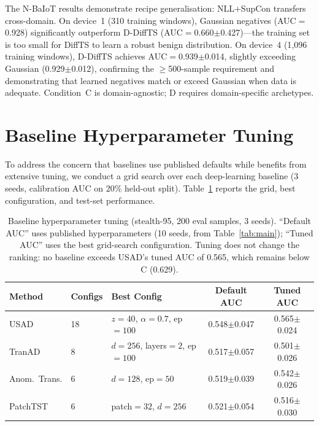 The N-BaIoT results demonstrate recipe generalisation:
NLL$+$SupCon transfers cross-domain.
On device~1 (310 training windows), Gaussian negatives (AUC$=$0.928)
significantly outperform D-DiffTS (AUC$=$0.660$\pm$0.427)---the
training set is too small for DiffTS to learn a robust benign distribution.
On device~4 (1{,}096 training windows), D-DiffTS achieves
AUC$=$0.939$\pm$0.014, slightly exceeding Gaussian (0.929$\pm$0.012),
confirming the $\geq$500-sample requirement and demonstrating that
learned negatives match or exceed Gaussian when data is adequate.
Condition~C is domain-agnostic; D requires domain-specific archetypes.

\section{Baseline Hyperparameter Tuning}
\label{app:baseline_grid}

To address the concern that baselines use published defaults while \ours{}
benefits from extensive tuning, we conduct a grid search over each
deep-learning baseline (3 seeds, calibration AUC on 20\% held-out split).
Table~\ref{tab:baseline_tuning} reports the grid, best configuration, and
test-set performance.

\begin{table}[h]
\centering
\small
\caption{
  Baseline hyperparameter tuning (stealth-95, 200 eval samples, 3 seeds).
  ``Default AUC'' uses published hyperparameters (10 seeds, from Table~\ref{tab:main});
  ``Tuned AUC'' uses the best grid-search configuration.
  Tuning does not change the ranking: no baseline exceeds
  USAD's tuned AUC of 0.565, which remains below \ours{} C (0.629).
}
\label{tab:baseline_tuning}
\begin{tabular}{llp{3.2cm}cc}
\toprule
Method & Configs & Best Config & Default AUC & Tuned AUC \\
\midrule
USAD & 18 & $z{=}40$, $\alpha{=}0.7$, ep${=}100$ & 0.548$\pm$0.047 & 0.565$\pm$0.024 \\
TranAD & 8 & $d{=}256$, layers${=}2$, ep${=}100$ & 0.517$\pm$0.057 & 0.501$\pm$0.026 \\
Anom.\ Trans. & 6 & $d{=}128$, ep${=}50$ & 0.519$\pm$0.039 & 0.542$\pm$0.026 \\
PatchTST & 6 & patch${=}32$, $d{=}256$ & 0.521$\pm$0.054 & 0.516$\pm$0.030 \\
\bottomrule
\end{tabular}
\end{table}

